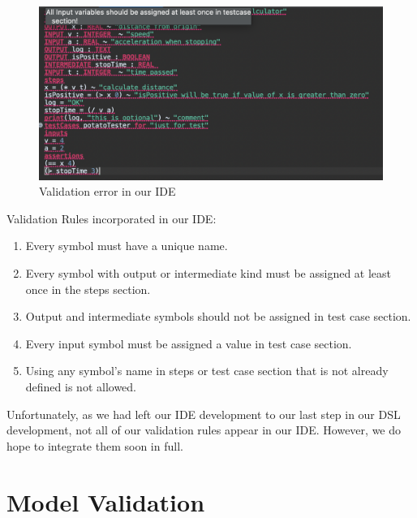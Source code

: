 \documentclass[11pt,fleqn]{article}
\begin{document}
\begin{figure}[h]
  \centering
  \includegraphics[width=1\textwidth]{ide2.png}
  \caption{Validation error in our IDE}
  \label{fig:ide2}
\end{figure}

\noindent{}Validation Rules incorporated in our IDE:
\begin{enumerate}

  \item Every symbol must have a unique name.

  \item Every symbol with output or intermediate kind must be assigned at least
        once in the steps section.

  \item Output and intermediate symbols should not be assigned in test case
        section.

  \item Every input symbol must be assigned a value in test case section.

  \item Using any symbol's name in steps or test case section that is not
        already defined is not allowed.

\end{enumerate}

Unfortunately, as we had left our IDE development to our last step in our DSL
development, not all of our validation rules appear in our IDE. However, we do
hope to integrate them soon in full.

\newpage{}

\section{Model Validation}
\label{sec:model-validation}
\end{document}
